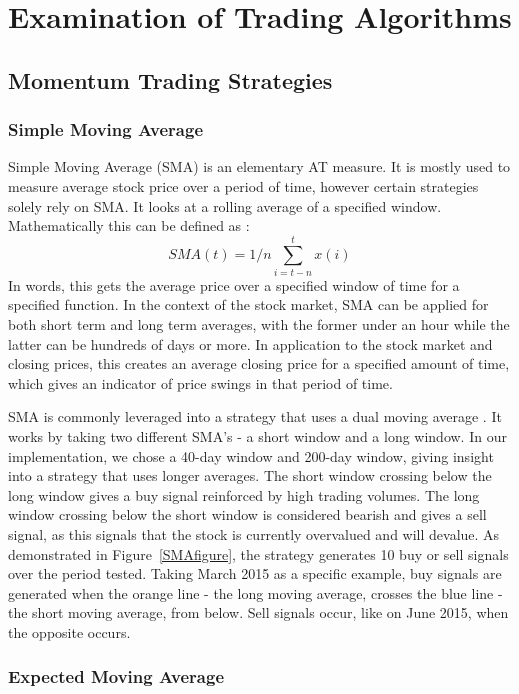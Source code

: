 \documentclass[../thesis.tex]{subfiles}
\begin{document}
\chapter{Examination of Trading Algorithms}
\label{ch:specific1}
\section{Momentum Trading Strategies}

\subsection{Simple Moving Average}
Simple Moving Average (SMA) is an elementary AT measure. It is mostly used to measure average stock price over a period of time, however certain strategies solely rely on SMA. It looks at a rolling average of a specified window. Mathematically this can be defined as \cite{AlmeidaTeixeira}:  \[ SMA(t) = 1/n \sum_{i=t-n}^{t}x(i) \]  In words, this gets the average price over a specified window of time for a specified function. In the context of the stock market, SMA can be applied for both short term and long term averages, with the former under an hour while the latter can be hundreds of days or more. In application to the stock market and closing prices, this creates an average closing price for a specified amount of time, which gives an indicator of price swings in that period of time.

SMA is commonly leveraged into a strategy that uses a dual moving average \cite{AlmeidaTeixeira}. It works by taking two different SMA's - a short window and a long window. In our implementation, we chose a 40-day window and 200-day window, giving insight into a strategy that uses longer averages. The short window crossing below the long window gives a buy signal reinforced by high trading volumes. The long window crossing below the short window is considered bearish and gives a sell signal, as this signals that the stock is currently overvalued and will devalue. As demonstrated in Figure~\ref{SMAfigure}, the strategy generates 10 buy or sell signals over the period tested. Taking March 2015 as a specific example, buy signals are generated when the orange line - the long moving average, crosses the blue line - the short moving average, from below. Sell signals occur, like on June 2015, when the opposite occurs.

\subsection{Expected Moving Average}
\end{document}
